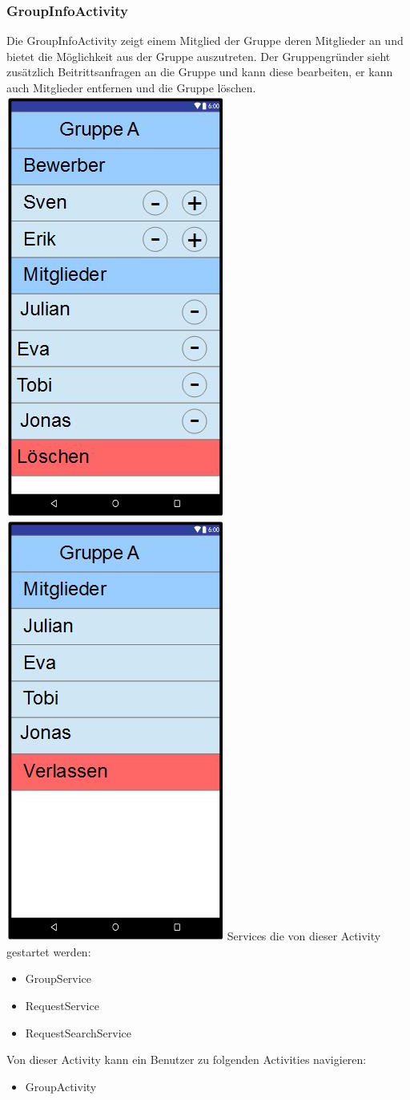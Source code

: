 	\subsubsection {GroupInfoActivity}
	Die GroupInfoActivity zeigt einem Mitglied der Gruppe deren Mitglieder an und bietet die Möglichkeit aus der Gruppe auszutreten. Der Gruppengründer sieht zusätzlich Beitrittsanfragen an die Gruppe und kann diese bearbeiten, er kann auch Mitglieder entfernen und die Gruppe löschen.
	\newline
	\includegraphics[width=.3\textwidth]{GUI_GruppeInfoGruender.jpg}
	\includegraphics[width=.3\textwidth]{GUI_GruppeInfoNormal.jpg}
	\newline
	Services die von dieser Activity gestartet werden:
	\begin{itemize}
	\item GroupService
	\item RequestService
	\item RequestSearchService
	\end{itemize}
	Von dieser Activity kann ein Benutzer zu folgenden Activities navigieren:
	\begin{itemize} 
	 \item GroupActivity
	 \end{itemize}
	 
